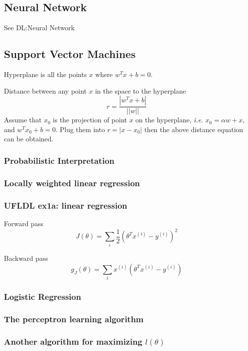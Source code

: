 \subsection{Neural Network}

 See DL:Neural Network

\subsection{Support Vector Machines}

 Hyperplane is all the points $x$ where $w^T x + b = 0$.

 Distance between any point $x$ in the space to the hyperplane
 $$r = \frac{|w^Tx+b|}{||w||}$$
 Assume that $x_0$ is the projection of point $x$ on the hyperplane,
 {\it i.e.} $x_0 = \alpha w+x$, and $w^T x_0 + b = 0$. Plug them into
 $r = |x - x_0|$ then the above distance equation can be obtained.


\subsubsection{Probabilistic Interpretation}

\subsubsection{Locally weighted linear regression}

\subsubsection{UFLDL ex1a: linear regression}

Forward pass
$$ J(\theta) = \sum_i \frac{1}{2} (\theta^T x^{(i)} - y^{(i)})^2 $$

Backward pass
$$ g_J(\theta) = \sum_i x^{(i)} (\theta^T x^{(i)} - y^{(i)}) $$


\subsubsection{Logistic Regression}

\subsubsection{The perceptron learning algorithm}

\subsubsection{Another algorithm for maximizing $l(\theta)$}

